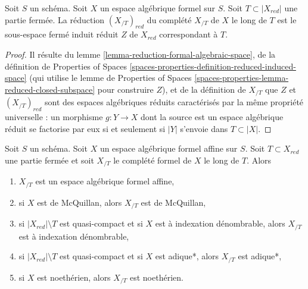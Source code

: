 \begin{lemma}
\label{lemma-reduction-recompletion}
Soit $S$ un schéma. Soit $X$ un espace algébrique formel sur $S$.
Soit $T \subset |X_{red}|$ une partie fermée. La réduction
$(X_{/T})_{red}$ du complété $X_{/T}$ de $X$ le long de $T$ est
le sous-espace fermé induit réduit $Z$ de $X_{red}$ correspondant à $T$.
\end{lemma}

\begin{proof}
Il résulte du lemme \ref{lemma-reduction-formal-algebraic-space},
de la définition de Properties of Spaces
\ref{spaces-properties-definition-reduced-induced-space}
(qui utilise le lemme de Properties of Spaces
\ref{spaces-properties-lemma-reduced-closed-subspace} pour construire $Z$),
et de la définition de $X_{/T}$ que
$Z$ et $(X_{/T})_{red}$ sont des espaces algébriques réduits
caractérisés par la même propriété universelle :
un morphisme $g : Y \to X$ dont la source est un espace algébrique réduit
se factorise par eux si et seulement si $|Y|$ s'envoie dans $T \subset |X|$.
\end{proof}

\begin{lemma}
\label{lemma-recompletion-affine-types}
Soit $S$ un schéma. Soit $X$ un espace algébrique formel affine sur $S$.
Soit $T \subset X_{red}$ une partie fermée et soit $X_{/T}$
le complété formel de $X$ le long de $T$. Alors
\begin{enumerate}
\item $X_{/T}$ est un espace algébrique formel affine,
\item si $X$ est de McQuillan, alors $X_{/T}$ est de McQuillan,
\item si $|X_{red}| \setminus T$ est quasi-compact et si $X$
est à indexation dénombrable, alors $X_{/T}$ est à indexation dénombrable,
\item si $|X_{red}| \setminus T$ est quasi-compact et si $X$
est adique*, alors $X_{/T}$ est adique*,
\item si $X$ est noethérien, alors $X_{/T}$ est noethérien.
\end{enumerate}
\end{lemma}


